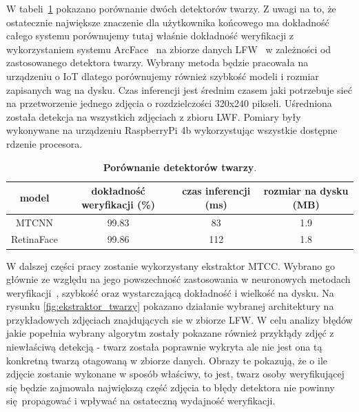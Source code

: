 W tabeli~\ref{table:face_detector} pokazano porównanie dwóch detektorów twarzy. Z uwagi na to, że
ostatecznie największe znaczenie dla użytkownika końcowego ma dokładność całego systemu
porównujemy tutaj właśnie dokładność weryfikacji z wykorzystaniem systemu ArcFace~\cite{Arcface} na
zbiorze danych LFW~\cite{DatasetLFW} w zależności od zastosowanego detektora twarzy. Wybrany
metoda będzie pracowała na urządzeniu o IoT dlatego porównujemy również szybkość modeli i 
rozmiar zapisanych wag na dysku. Czas inferencji jest średnim czasem jaki potrzebuje sieć na
przetworzenie jednego zdjęcia o rozdzielczości 320x240 pikseli. Uśredniona została detekcja na
wszystkich zdjęciach z zbioru LWF. Pomiary były wykonywane na urządzeniu RaspberryPi 4b
wykorzystując wszystkie dostępne rdzenie procesora.

\begin{table}[h]
\begin{center}
\begin{tabular}{cccc}
\hline
model & dokładność weryfikacji (\%)  &  czas inferencji (ms)  &   rozmiar na dysku (MB)  \\
\hline
MTCNN \cite{MTCNN}     & \num{99.83} & \num{83} & \num{1.9} \\ 
RetinaFace \cite{RetinaFace}   & \num{99.86}  & \num{112}& \num{1.8}  \\
\hline
\end{tabular}
\end{center}
\caption{\textbf{Porównanie detektorów twarzy}.}
\label{table:face_detector}
\vspace{-4mm}
\end{table}

W dalszej części pracy zostanie wykorzystany ekstraktor MTCC. Wybrano go głównie ze względu na jego
powszechność zastosowania w neuronowych metodach weryfikacji~\cite{Cosface,Arcface,Facenet}, szybkość oraz wystarczającą dokładność i wielkość na dysku. Na rysunku \ref{fig:ekstraktor_twarzy}
pokazano działanie wybranej architektury na przykładowych zdjęciach znajdujących sie w zbiorze
LFW. W celu analizy błędów jakie popełnia wybrany algorytm zostały pokazane
również przykłądy zdjęć z niewłaściwą detekcją - twarz została poprawnie wykryta ale nie jest ona
tą konkretną twarzą otagowaną w zbiorze danych. Obrazy te pokazują, że o ile zdjęcie zostanie wykonane w sposób właściwy, to jest, twarz osoby weryfikującej się będzie zajmowała największą część zdjęcia to błędy detektora nie powinny się propagować i wpływać na ostateczną wydajność weryfikacji.

